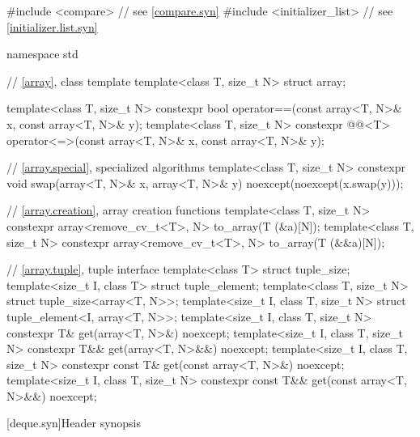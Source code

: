 %
\begin{codeblock}
#include <compare>              // see \ref{compare.syn}
#include <initializer_list>     // see \ref{initializer.list.syn}

namespace std {
  // \ref{array}, class template 
  template<class T, size_t N> struct array;

  template<class T, size_t N>
    constexpr bool operator==(const array<T, N>& x, const array<T, N>& y);
  template<class T, size_t N>
    constexpr @@<T>
      operator<=>(const array<T, N>& x, const array<T, N>& y);

  // \ref{array.special}, specialized algorithms
  template<class T, size_t N>
    constexpr void swap(array<T, N>& x, array<T, N>& y) noexcept(noexcept(x.swap(y)));

  // \ref{array.creation}, array creation functions
  template<class T, size_t N>
    constexpr array<remove_cv_t<T>, N> to_array(T (&a)[N]);
  template<class T, size_t N>
    constexpr array<remove_cv_t<T>, N> to_array(T (&&a)[N]);

  // \ref{array.tuple}, tuple interface
  template<class T> struct tuple_size;
  template<size_t I, class T> struct tuple_element;
  template<class T, size_t N>
    struct tuple_size<array<T, N>>;
  template<size_t I, class T, size_t N>
    struct tuple_element<I, array<T, N>>;
  template<size_t I, class T, size_t N>
    constexpr T& get(array<T, N>&) noexcept;
  template<size_t I, class T, size_t N>
    constexpr T&& get(array<T, N>&&) noexcept;
  template<size_t I, class T, size_t N>
    constexpr const T& get(const array<T, N>&) noexcept;
  template<size_t I, class T, size_t N>
    constexpr const T&& get(const array<T, N>&&) noexcept;
}
\end{codeblock}

[deque.syn]{Header  synopsis}


